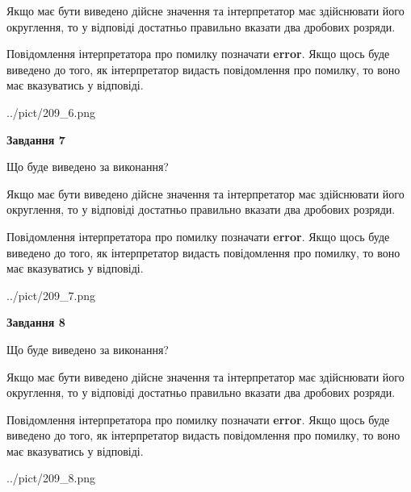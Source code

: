 \documentclass[12pt, ukrainian]{article}
\begin{document}
{\begin {Large}
Якщо має бути виведено дійсне значення та інтерпретатор має здійснювати його округлення, 
то у відповіді достатньо правильно вказати два дробових розряди.

Повідомлення інтерпретатора про помилку позначати \textbf{error}.
Якщо щось буде виведено до того, як інтерпретатор видасть повідомлення про помилку, 
то воно має вказуватись у відповіді. \par

\begin{center}
	{../pict/209_6.png}
\end{center}
\newpage

{\begin {center}\textbf{Завдання 7}\end {center}}\par
Що буде виведено за виконання? \par

Якщо має бути виведено дійсне значення та інтерпретатор має здійснювати його округлення, 
то у відповіді достатньо правильно вказати два дробових розряди.

Повідомлення інтерпретатора про помилку позначати \textbf{error}.
Якщо щось буде виведено до того, як інтерпретатор видасть повідомлення про помилку, 
то воно має вказуватись у відповіді. \par

\begin{center}
	{../pict/209_7.png}
\end{center}
\newpage

{\begin {center}\textbf{Завдання 8}\end {center}}\par
Що буде виведено за виконання? \par

Якщо має бути виведено дійсне значення та інтерпретатор має здійснювати його округлення, 
то у відповіді достатньо правильно вказати два дробових розряди.

Повідомлення інтерпретатора про помилку позначати \textbf{error}.
Якщо щось буде виведено до того, як інтерпретатор видасть повідомлення про помилку, 
то воно має вказуватись у відповіді. \par

\begin{center}
	{../pict/209_8.png}
\end{center}
\newpage


\end{Large}}
\end{document}
